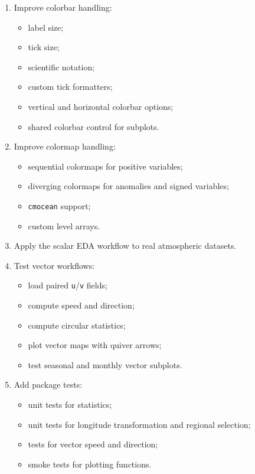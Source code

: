 \documentclass[11pt,a4paper]{article}
\begin{document}
\begin{enumerate}[label=\arabic*.]
    \item Improve colorbar handling:
    \begin{itemize}
        \item label size;
        \item tick size;
        \item scientific notation;
        \item custom tick formatters;
        \item vertical and horizontal colorbar options;
        \item shared colorbar control for subplots.
    \end{itemize}

    \item Improve colormap handling:
    \begin{itemize}
        \item sequential colormaps for positive variables;
        \item diverging colormaps for anomalies and signed variables;
        \item \texttt{cmocean} support;
        \item custom level arrays.
    \end{itemize}

    \item Apply the scalar EDA workflow to real atmospheric datasets.

    \item Test vector workflows:
    \begin{itemize}
        \item load paired \texttt{u}/\texttt{v} fields;
        \item compute speed and direction;
        \item compute circular statistics;
        \item plot vector maps with quiver arrows;
        \item test seasonal and monthly vector subplots.
    \end{itemize}

    \item Add package tests:
    \begin{itemize}
        \item unit tests for statistics;
        \item unit tests for longitude transformation and regional selection;
        \item tests for vector speed and direction;
        \item smoke tests for plotting functions.
    \end{itemize}
\end{enumerate}
\end{document}
